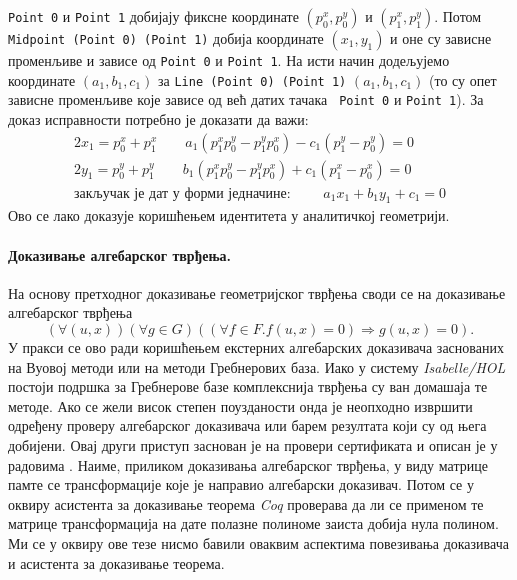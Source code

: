 {\tt Point 0} и {\tt Point 1} добијају фиксне координате $(p_0^x,
p_0^y)$ и $(p_1^x, p_1^y)$. Потом {\tt Midpoint (Point 0) (Point 1)}
добија координате $(x_1, y_1)$ и оне су зависне променљиве и зависе од
{\tt Point 0} и {\tt Point 1}. На исти начин додељујемо координате
$(a_1, b_1, c_1)$ за {\tt Line (Point 0) (Point 1)} $(a_1, b_1, c_1)$
(то су опет зависне променљиве које зависе од већ датих тачака {\tt
  Point 0} и {\tt Point 1}). За доказ исправности потребно је доказати
да важи:
\begin{align}
 2x_1 = p_0^x + p_1^x \qquad a_1(p_1^xp_0^y - p_1^yp_0^x) - c_1(p_1^y - p_0^y) = 0 \nonumber \\ 
 2y_1 = p_0^y + p_1^y \qquad b_1(p_1^xp_0^y - p_1^yp_0^x) + c_1(p_1^x - p_0^x) = 0 \nonumber \\
 \textrm{закључак је дат у форми једначине: } \qquad a_1x_1 + b_1y_1 + c_1 = 0 \nonumber
\end{align}
Ово се лако доказује коришћењем идентитета у аналитичкој геометрији.

\paragraph{Доказивање алгебарског тврђења.}
На основу претходног доказивање геометријског тврђења своди се на
доказивање алгебарског тврђења
$$(\forall (u, x))(\forall g\in G)( (\forall f\in F. f(u,x) = 0)
\Rightarrow g(u,x) = 0).$$ У пракси се ово ради коришћењем екстерних
алгебарских доказивача заснованих на Вуовој методи или на методи
Гребнерових база. Иако у систему \emph{Isabelle/HOL} постоји подршка
за Гребнерове базе комплекснија тврђења су ван домашаја те методе. Ако
се жели висок степен поузданости онда је неопходно извршити одређену
проверу алгебарског доказивача или барем резултата који су од њега
добијени. Овај други приступ заснован је на провери сертификата и
описан је у радовима \cite{grobnercoq, narboux2015towards}. Наиме,
приликом доказивања алгебарског тврђења, у виду матрице памте се
трансформације које је направио алгебарски доказивач. Потом се у
оквиру асистента за доказивање теорема \emph{Coq} проверава да ли се
применом те матрице трансформација на дате полазне полиноме заиста
добија нула полином. Ми се у оквиру ове тезе нисмо бавили оваквим
аспектима повезивања доказивача и асистента за доказивање теорема.

